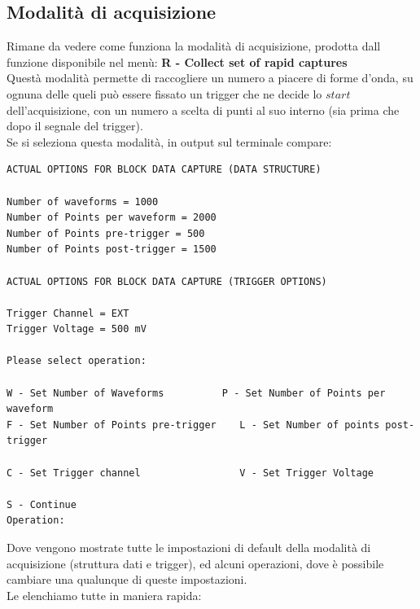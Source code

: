 \documentclass[a4paper]{article}
\begin{document}
\subsection{Modalità di acquisizione}
Rimane da vedere come funziona la modalità di acquisizione, prodotta dall funzione disponibile nel menù:
\textbf{R - Collect set of rapid captures} \\
\noindent Questà modalità permette di raccogliere un numero a piacere di forme d'onda, su ognuna delle queli può essere fissato un trigger che ne decide lo $start$ dell'acquisizione, con un numero a scelta di punti al suo interno (sia prima che dopo il segnale del trigger).\\
\noindent Se si seleziona questa modalità, in output sul terminale compare:
\begin{tcolorbox}
\begin{Verbatim}[tabsize = 4]
ACTUAL OPTIONS FOR BLOCK DATA CAPTURE (DATA STRUCTURE)

Number of waveforms = 1000
Number of Points per waveform = 2000
Number of Points pre-trigger = 500
Number of Points post-trigger = 1500

ACTUAL OPTIONS FOR BLOCK DATA CAPTURE (TRIGGER OPTIONS)

Trigger Channel = EXT
Trigger Voltage = 500 mV

Please select operation:

W - Set Number of Waveforms			 P - Set Number of Points per waveform
F - Set Number of Points pre-trigger	L - Set Number of points post-trigger

C - Set Trigger channel 		        V - Set Trigger Voltage

S - Continue
Operation:
\end{Verbatim}
\end{tcolorbox}
Dove vengono mostrate tutte le impostazioni di default della modalità di acquisizione (struttura dati e trigger), ed alcuni operazioni, dove è possibile cambiare una qualunque di queste impostazioni.\\
\noindent Le elenchiamo tutte in maniera rapida:
\end{document}
